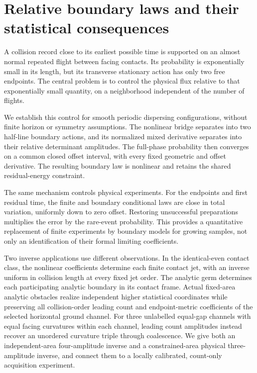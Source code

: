 \section{Relative boundary laws and their statistical consequences}
\label{sec:geometric-results}
A collision record close to its earliest possible time is supported on
an almost normal repeated flight between facing contacts. Its probability
is exponentially small in its length, but its transverse stationary
action has only two free endpoints. The central problem is to control
the physical flux relative to that exponentially small quantity, on a
neighborhood independent of the number of flights.

We establish this control for smooth periodic dispersing configurations,
without finite horizon or symmetry assumptions. The nonlinear bridge
separates into two half-line boundary actions, and its normalized mixed
derivative separates into their relative determinant amplitudes. The
full-phase probability then converges on a common closed offset interval,
with every fixed geometric and offset derivative. The resulting boundary
law is nonlinear and retains the shared residual-energy constraint.

The same mechanism controls physical experiments. For the endpoints and
first residual time, the finite and boundary conditional laws are close
in total variation, uniformly down to zero offset. Restoring unsuccessful
preparations multiplies the error by the rare-event probability. This
provides a quantitative replacement of finite experiments by boundary
models for growing samples, not only an identification of their formal
limiting coefficients.

Two inverse applications use different observations. In the identical-even
contact class, the nonlinear coefficients determine each finite contact
jet, with an inverse uniform in collision length at every fixed jet order.
The analytic germ determines each participating analytic boundary in its
contact frame. Actual fixed-area analytic obstacles realize independent
higher statistical coordinates while preserving all collision-order
leading count and endpoint-metric coefficients of the selected horizontal
ground channel. For three unlabelled equal-gap channels with equal facing
curvatures within each channel, leading count amplitudes instead recover
an unordered curvature triple through coalescence. We give both an
independent-area four-amplitude inverse and a constrained-area physical
three-amplitude inverse, and connect them to a locally calibrated,
count-only acquisition experiment.

